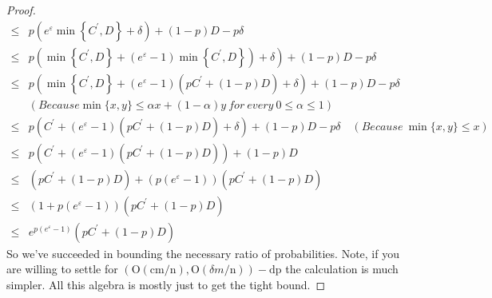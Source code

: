 \documentclass{ctexart}
\begin{document}
\begin{proof}
$$\begin{aligned}
            \leq & p\left(e^{\varepsilon} \min \left\{C^{\prime}, D\right\}+\delta\right)+(1-p) D-p \delta                                                                 \\
            \leq & \left.p\left(\min \left\{C^{\prime}, D\right\}+\left(e^{\varepsilon}-1\right) \min \left\{C^{\prime}, D\right\}\right)+\delta\right)+(1-p) D-p \delta   \\
            \leq & p\left(\min \left\{C^{\prime}, D\right\}+\left(e^{\varepsilon}-1\right)\left(p C^{\prime}+(1-p) D\right)+\delta\right)+(1-p) D-p \delta\\
            &(Because \min \{x, y\} \leq \alpha x+(1-\alpha) y\ for\ every\ 0 \leq \alpha \leq 1 )                                                                         \\
            \leq & p\left(C^{\prime}+\left(e^{\varepsilon}-1\right)\left(p C^{\prime}+(1-p) D\right)+\delta\right)+(1-p) D-p \delta \quad
            ( Because\ \min \{x, y\} \leq x) \\
            \leq & p\left(C^{\prime}+\left(e^{\varepsilon}-1\right)\left(p C^{\prime}+(1-p) D\right)\right)+(1-p) D                                                        \\
            \leq & \left(p C^{\prime}+(1-p) D\right)+\left(p\left(e^{\varepsilon}-1\right)\right)\left(p C^{\prime}+(1-p) D\right)                                         \\
            \leq & \left(1+p\left(e^{\varepsilon}-1\right)\right)\left(p C^{\prime}+(1-p) D\right)                                                                         \\
            \leq & e^{p\left(e^{\varepsilon}-1\right)}\left(p C^{\prime}+(1-p) D\right)\end{aligned}$$
    So we've succeeded in bounding the necessary ratio of probabilities. Note, if you are willing to settle for $(\mathrm{O}(\mathrm{cm} / \mathrm{n}), \mathrm{O}(\delta m / \mathrm{n}))-\mathrm{d} \mathrm{p}$ the calculation is much simpler. All this algebra is mostly just to get the tight bound.
\end{proof}
\end{document}
